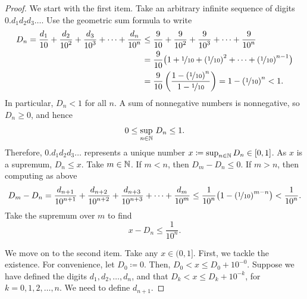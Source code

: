 \begin{proof}
We start with the first item.  Take an arbitrary infinite sequence of
digits $0.d_1d_2d_3\ldots$.  Use the geometric sum formula to write
\begin{equation*}
\begin{split}
D_n =
\frac{d_1}{10} +
\frac{d_2}{{10}^2} +
\frac{d_3}{{10}^3} +
\cdots +
\frac{d_n}{{10}^n}
& \leq
\frac{9}{10} +
\frac{9}{{10}^2} +
\frac{9}{{10}^3} +
\cdots +
\frac{9}{{10}^n}
\\
& =
\frac{9}{10}
\bigl( 1 + \nicefrac{1}{10} +
{(\nicefrac{1}{10})}^2 + \cdots +
{(\nicefrac{1}{10})}^{n-1} \bigr)
\\
& =
\frac{9}{10}
\left(
\frac{1-{(\nicefrac{1}{10})}^{n}}{1-\nicefrac{1}{10}}
\right)
= 1-{(\nicefrac{1}{10})}^{n}
< 1 .
\end{split}
\end{equation*}
In particular, $D_n < 1$ for all $n$.  A sum of nonnegative numbers is
nonnegative, so $D_n \geq 0$, and hence
\begin{equation*}
0 \leq \sup_{n\in {\mathbb{N}}} \, D_n \leq 1 .
\end{equation*}
Therefore, $0.d_1d_2d_3\ldots$ represents a unique number $x \coloneqq \sup_{n\in
{\mathbb{N}}} D_n \in [0,1]$.
As $x$ is a supremum, $D_n \leq x$.
Take $m \in {\mathbb{N}}$.  If $m < n$, then $D_m - D_n \leq 0$.  If $m > n$, then
computing as above
\begin{equation*}
D_m - D_n
=
\frac{d_{n+1}}{{10}^{n+1}} +
\frac{d_{n+2}}{{10}^{n+2}} +
\frac{d_{n+3}}{{10}^{n+3}} +
\cdots +
\frac{d_{m}}{{10}^m}
\leq
\frac{1}{{10}^{n}}
\bigl(
1-{(\nicefrac{1}{10})}^{m-n}
\bigr)
<
\frac{1}{{10}^{n}} .
\end{equation*}
Take the supremum over $m$ to find
\begin{equation*}
x - D_n
\leq
\frac{1}{{10}^{n}} .
\end{equation*}

We move on to the
second item.  Take any $x \in (0,1]$.
First, we tackle the existence.
For convenience, let $D_0 \coloneqq 0$.
Then,
$D_0 < x \leq D_0 + {10}^{-0}$.
Suppose we have defined the digits $d_1,d_2,\ldots,d_n$,
and that
$D_k < x \leq D_k + {10}^{-k}$, for $k=0,1,2,\ldots,n$.  We need to define $d_{n+1}$.


\end{proof}
